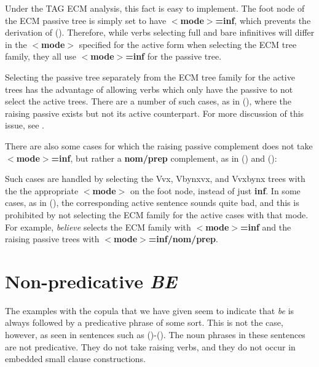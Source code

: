 
Under the TAG ECM analysis, this fact is easy to implement.  The foot
node of the ECM passive tree is simply set to have {\bf $<$mode$>$=inf},
which prevents the derivation of ().  Therefore, while verbs
selecting full and bare infinitives will differ in the {\bf $<$mode$>$} 
specified for the active form when selecting the ECM tree family, they
all use {\bf $<$mode$>$=inf} for the passive tree.

Selecting the passive tree separately from the ECM tree family for the
active trees has the advantage of allowing verbs which only have the passive to
not select the active trees.  There are a number of such cases,
as in (), where
the raising passive exists but not its active counterpart.  For more 
discussion of this issue, see \cite{kj85}.


There are also some cases for which the raising passive complement does
not take {\bf $<$mode$>$=inf}, but rather a {\bf nom/prep} complement,
as in () and ():


Such cases are handled by selecting the Vvx, Vbynxvx, and Vvxbynx trees
with the the appropriate {\bf $<$mode$>$} on the foot node, instead of just
{\bf inf}.  In some cases, as in (), the corresponding active
sentence sounds quite bad, and this is prohibited by not selecting the
ECM family for the active cases with that mode.  For example, {\it believe}
selects the ECM family with {\bf $<$mode$>$=inf} and the raising passive
trees with {\bf $<$mode$>$=inf/nom/prep}.

\section{Non-predicative {\it BE}}
\label{equative-be-xtag-analysis}

The examples with the copula that we have given seem to indicate that {\it be}
is always followed by a predicative phrase of some sort.  This is not the case,
however, as seen in sentences such as ({})-({}).  The noun phrases in
these sentences are not predicative.  They do not take raising verbs, and they
do not occur in embedded small clause constructions.

